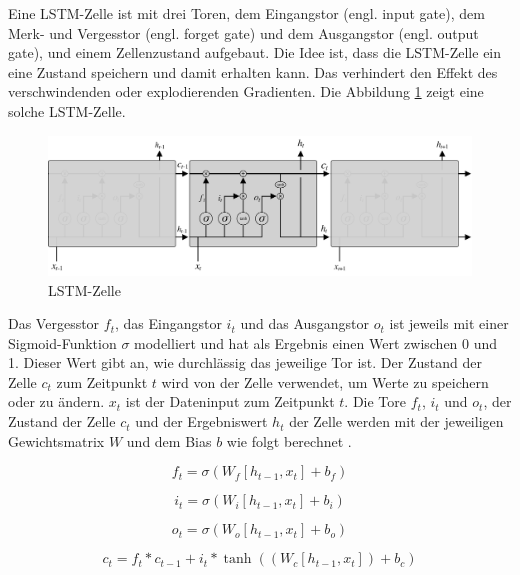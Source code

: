 Eine \ac{LSTM}-Zelle ist mit drei Toren, dem Eingangstor (engl. input gate), dem Merk- und Vergesstor (engl. forget gate) und dem Ausgangstor (engl. output gate), und einem Zellenzustand aufgebaut. Die Idee ist, dass die \ac{LSTM}-Zelle ein eine Zustand speichern und damit erhalten kann. Das verhindert den Effekt des verschwindenden oder explodierenden Gradienten. Die Abbildung \ref{fig_lstm} zeigt eine solche \ac{LSTM}-Zelle.

\begin{figure}[h]
\centering
\includegraphics[scale=0.4]{images/lstm.pdf}
\caption[\acl{LSTM}-Zelle]{\acl{LSTM}-Zelle \cite{olah2015lstm}}
\label{fig_lstm}
\end{figure}

Das Vergesstor $f_t$, das Eingangstor $i_t$ und das Ausgangstor $o_t$ ist jeweils mit einer Sigmoid-Funktion $\sigma$ modelliert und hat als Ergebnis einen Wert zwischen 0 und 1. Dieser Wert gibt an, wie durchlässig das jeweilige Tor ist. Der Zustand der Zelle $c_t$ zum Zeitpunkt $t$ wird von der Zelle verwendet, um Werte zu speichern oder zu ändern. $x_t$ ist der Dateninput zum Zeitpunkt $t$. Die Tore $f_t$, $i_t$ und $o_t$, der Zustand der Zelle $c_t$ und der Ergebniswert $h_t$ der Zelle werden mit der jeweiligen Gewichtsmatrix $W$ und dem Bias $b$ wie folgt berechnet \cite{olah2015lstm}.

\begin{equation}
f_t = \sigma (W_f[h_{t-1}, x_t] + b_f)
\end{equation}

\begin{equation}
i_t = \sigma (W_i[h_{t-1}, x_t] + b_i)
\end{equation}

\begin{equation}
o_t = \sigma (W_o[h_{t-1}, x_t] + b_o)
\end{equation}

\begin{equation}
c_t = f_t * c_{t-1} + i_t * \tanh((W_c[h_{t-1}, x_t]) + b_c)
\end{equation}

